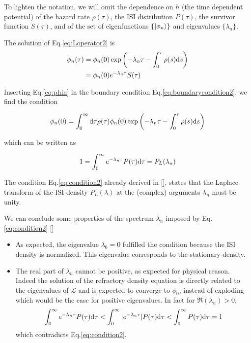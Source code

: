 \documentclass[12pt,twoside]{report}
\def \dd  {{\rm d}}
\begin{document}
To lighten the notation, we will omit the dependence on $h$ (the time dependent potential) of the hazard rate $\rho(\tau)$, the ISI distribution $P(\tau)$, the survivor function $S(\tau)$, and of the set of eigenfunctions $\{\ket{\phi_n}\}$ and eigenvalues $\{\lambda_n\}$.

The solution of Eq.\eqref{eq:Loperator2} is
\begin{align}
\label{eq:phin}
\phi_n(\tau)&=\phi_n(0)\exp\left(-\lambda_n\tau-\int_0^\tau\rho(s)\dd s\right)\nonumber\\
&=\phi_n(0)e^{-\lambda_n\tau}S(\tau)
\end{align}

Inserting Eq.\eqref{eq:phin} in the boundary condition Eq.\eqref{eq:boundarycondition2}, we find the condition

\begin{equation}
\label{eq:condition1}
\phi_n(0)=\int_0^\infty\dd\tau\rho(\tau)\phi_n(0)\exp\left(-\lambda_n\tau-\int_0^\tau\rho(s)\dd s\right)
\end{equation}

which can be written as

\begin{equation}
\label{eq:condition2}
1=\int_0^\infty e^{-\lambda_n \tau}P(\tau)\dd\tau=P_L(\lambda_n)\\
\end{equation}

The condition Eq.\eqref{eq:condition2} already derived in [\cite{Sch16}], states that the Laplace transform of the ISI density $P_L(\lambda)$ at the (complex) arguments $\lambda_{n}$ must be unity. 

We can conclude some properties of the spectrum {$\lambda_n$} imposed by Eq.\eqref{eq:condition2} [\cite{Sch16}]

\begin{itemize}
\item As expected, the eigenvalue $\lambda_0=0$ fulfilled the condition because the ISI density is normalized. This eigenvalue corresponds to the stationary density.
\item The real part of $\lambda_n$ cannot be positive, as expected for physical reason. Indeed the solution of the refractory density equation is directly related to the eigenvalues of $\mathcal{L}$ and is expected to converge to $\phi_0$, instead of exploding which would be the case for positive eigenvalues. In fact for $\Re(\lambda_n)>0$,\begin{equation}
\int_0^\infty e^{-\lambda_n \tau} P(\tau) \dd\tau<\int_0^\infty |e^{-\lambda_n\tau} |P(\tau) \dd\tau<\int_0^\infty P(\tau) \dd\tau=1
\end{equation}which contradicts Eq.\eqref{eq:condition2}.
\end{itemize}
\end{document}
